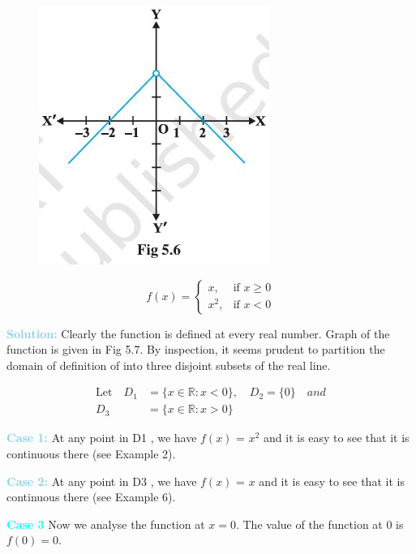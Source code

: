 \documentclass[a4paper,12pt]{article}
\begin{document}
\begin{figure}
    \centering
    \hspace*{2cm} 
    \includegraphics[width=1\linewidth]{d.jpg}

\end{figure}

\[
\hspace{0cm}
f(x) = \begin{cases} 
    x, & \text{if } x \geq 0 \\
    x^2, & \text{if } x < 0
\end{cases}
\]


\noindent \textbf{\textcolor{skyblue}{Solution:}} Clearly the function is defined at every real number. Graph of the function is given in Fig 5.7. By inspection, it seems prudent to partition the domain of definition of  into three disjoint subsets of the real line.
\vspace{-6pt}

\[
\begin{aligned}
    \text{Let} \quad D_1 &= \{x \in \mathbb{R} : x < 0\}, \quad D_2 = \{0\} \quad and \\
    D_3 &= \{x \in \mathbb{R} : x > 0\}
\end{aligned}
\]


\noindent \textbf{\textcolor{skyblue}{Case 1:}} At any point in D1
 , we have $f(x)$ = $x^2$ and it is easy to see that it is continuous
 there (see Example 2).  \hfill

\noindent \textbf{\textcolor{skyblue}{Case 2:}} At any point in D3
 , we have $f(x)$ = $x$ and it is easy to see that it is continuous
 there (see Example 6). \hfill

\noindent \textbf{\textcolor{cyan}{Case 3}} Now we analyse the function at \( x = 0 \). The value of the function at 0 is \( f(0) = 0 \). 
\end{document}
